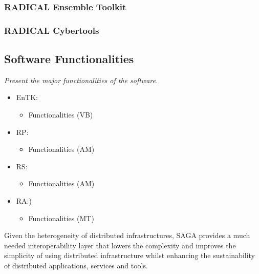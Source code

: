 \documentclass[preprint,12pt, a4paper]{elsarticle}
\begin{document}
\subsubsection{RADICAL Ensemble Toolkit}\label{sssec:arch_entk}


\subsubsection{RADICAL Cybertools}\label{sssec:arch_rct}


\subsection{Software Functionalities}\label{ssec:functionalities}

{\em Present the major functionalities of the software.}

\begin{itemize}
  \item EnTK\@:
  \begin{itemize}
    \item Functionalities (VB)
  \end{itemize}
  \item RP\@: 
  \begin{itemize}
    \item Functionalities (AM)
  \end{itemize}
  \item RS\@:
  \begin{itemize}
    \item Functionalities (AM)
  \end{itemize}
  \item RA\@:)
  \begin{itemize}
    \item Functionalities (MT)
  \end{itemize}
\end{itemize}

Given the heterogeneity of distributed infrastructures, SAGA provides a much
needed interoperability layer that lowers the complexity and improves the
simplicity of using distributed infrastructure whilst enhancing the
sustainability of distributed applications, services and tools.
\end{document}
